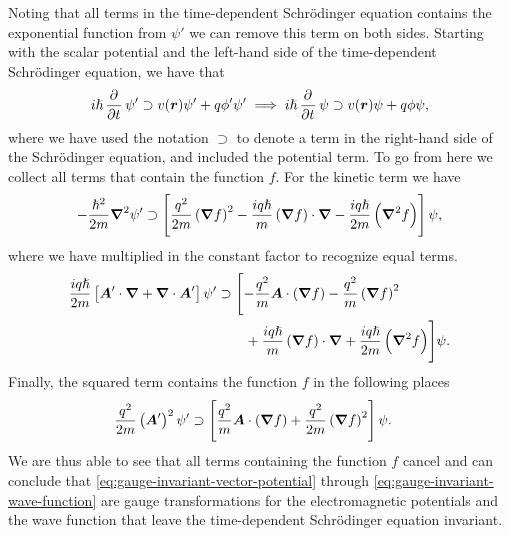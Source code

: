         Noting that all terms in the time-dependent Schrödinger equation
        contains the exponential function from $\psi'$ we can remove this term
        on both sides.
        Starting with the scalar potential and the left-hand side of the
        time-dependent Schrödinger equation, we have that
        \begin{align}
            i\hslash\dpd{}{t}\psi'
            \supset
            v(\vfg{r})\psi'
            +
            q\phi'\psi'
            \implies
            i\hslash\dpd{}{t}\psi
            \supset
            v(\vfg{r})\psi
            +
            q\phi\psi,
        \end{align}
        where we have used the notation $\supset$ to denote a term in the right-hand
        side of the Schrödinger equation, and included the potential term.
        To go from here we collect all terms that contain the function $f$.
        For the kinetic term we have
        \begin{align}
            -\frac{\hslash^2}{2m}\boldsymbol{\nabla}^2\psi'
            \supset
            \left[ 
                \frac{q^2}{2m}\left( \boldsymbol{\nabla}f \right)^2
                - \frac{iq\hslash}{m}\left( \boldsymbol{\nabla}f \right)\cdot\boldsymbol{\nabla}
                - \frac{iq\hslash}{2m}\left( \boldsymbol{\nabla}^2f \right)
             \right]\psi,
        \end{align}
        where we have multiplied in the constant factor to recognize equal terms.
        \begin{align}
            \frac{iq\hslash}{2m}\left[ 
                \boldsymbol{A}'\cdot\boldsymbol{\nabla}
                + \boldsymbol{\nabla}\cdot\boldsymbol{A}'
             \right]\psi'
            &\supset
            \Biggl[
                - \frac{q^2}{m}\boldsymbol{A}\cdot\left( \boldsymbol{\nabla}f \right)
                - \frac{q^2}{m}\left( \boldsymbol{\nabla}f \right)^2
                \nonumber \\
                &\qquad
                + \frac{iq\hslash}{m}\left( \boldsymbol{\nabla}f \right)\cdot\boldsymbol{\nabla}
                + \frac{iq\hslash}{2m}\left( \boldsymbol{\nabla}^2f \right)
            \Biggr]\psi.
        \end{align}
        Finally, the squared term contains the function $f$ in the following
        places
        \begin{align}
            \frac{q^2}{2m}\left( \boldsymbol{A}' \right)^2\psi'
            &\supset
            \left[ 
                \frac{q^2}{m}\boldsymbol{A}\cdot\left( \boldsymbol{\nabla}f \right)
                + \frac{q^2}{2m}\left( \boldsymbol{\nabla}f \right)^2
             \right]\psi.
        \end{align}
        We are thus able to see that all terms containing the function $f$
        cancel and can conclude that
        \autoref{eq:gauge-invariant-vector-potential} through
        \autoref{eq:gauge-invariant-wave-function} are gauge transformations for
        the electromagnetic potentials and the wave function that leave the
        time-dependent Schrödinger equation invariant.

